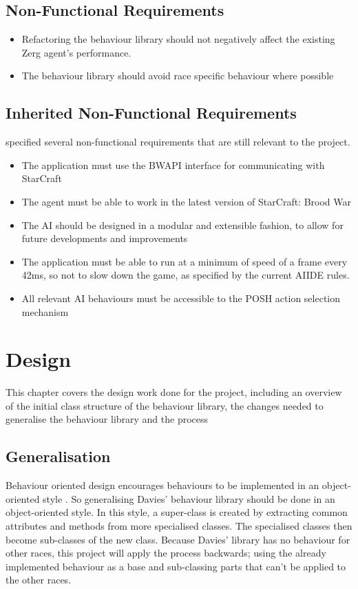 \documentclass[11pt,openright,a4paper]{report}
\begin{document}
\section{Non-Functional Requirements}
\begin{itemize}
\item{Refactoring the behaviour library should not negatively affect the existing Zerg agent's performance.}
\item{The behaviour library should avoid race specific behaviour where possible}
\end{itemize}

\section{Inherited Non-Functional Requirements}
 specified several non-functional requirements that are still relevant to the project.
\begin{itemize}
\item{The application must use the BWAPI interface for communicating with StarCraft}
\item{The agent must be able to work in the latest version of StarCraft: Brood War}
\item{The AI should be designed in a modular and extensible fashion, to allow for future developments and improvements}
\item{The application must be able to run at a minimum of speed of a frame every 42ms, so not to slow down the game, as specified by the current AIIDE rules.}
\item{All relevant AI behaviours must be accessible to the POSH action selection mechanism}
\end{itemize}


\chapter{Design}
This chapter covers the design work done for the project, including an overview of the initial class structure of the behaviour library, the changes needed to generalise the behaviour library and the process

\section{Generalisation}
Behaviour oriented design encourages behaviours to be implemented in an object-oriented style \cite{bryson2003behavior}. So generalising Davies' behaviour library should be done in an object-oriented style. In this style, a super-class is created by extracting common attributes and methods from more specialised classes. The specialised classes then become sub-classes of the new class. Because Davies' library has no behaviour for other races, this project will apply the process backwards; using the already implemented behaviour as a base and sub-classing parts that can't be applied to the other races. 
\end{document}
